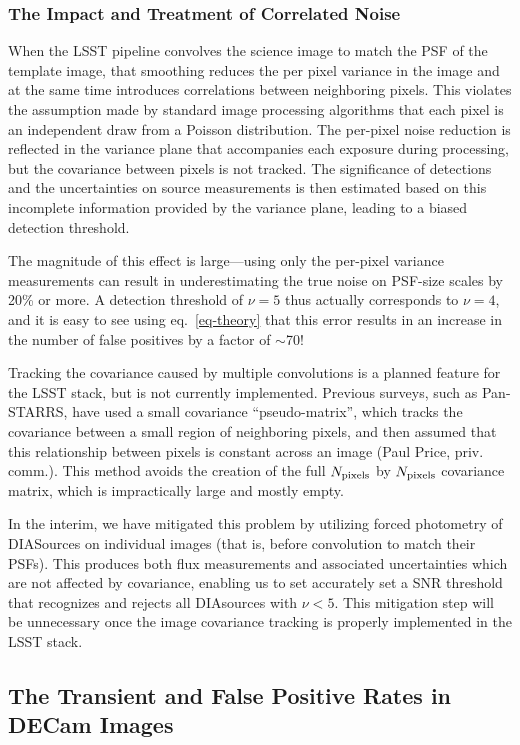 \subsubsection{The Impact and Treatment of Correlated Noise} 

When the LSST pipeline convolves the science image to match the PSF of the template 
image, that smoothing reduces the per pixel variance in the image and at the same
time introduces correlations between neighboring pixels. This violates the
assumption made by standard image processing algorithms that each pixel is an
independent draw from a Poisson distribution. The per-pixel noise reduction is
reflected in the variance plane that accompanies each exposure during
processing, but the covariance between pixels is not tracked. 
The significance of detections and the uncertainties on source measurements is
then estimated based on this incomplete information provided by the variance
plane, leading to a biased detection threshold. 

The magnitude of this effect is large---using only the per-pixel variance
measurements can result in underestimating the true noise on PSF-size scales by
20\% or more. A detection threshold of $\nu=5$ thus actually corresponds to
$\nu=4$, and it is easy to see using eq.~\ref{eq-theory} that this error results
in an increase in the number of false positives by a factor of $\sim$70!

Tracking the covariance caused by multiple convolutions is a planned feature for
the LSST stack, but is not currently implemented. Previous surveys, such as
Pan-STARRS, have used a small covariance ``pseudo-matrix'', which tracks the
covariance between a small region of neighboring pixels, and then assumed that 
this relationship between pixels is constant across an image (Paul Price, priv. comm.).
This method avoids the creation of the full $N_{\rm pixels}$ by $N_{\rm pixels}$
covariance matrix, which is impractically large and mostly empty.

In the interim, we have mitigated this problem by utilizing forced photometry of DIASources
on individual images (that is, before convolution to match their PSFs). This
produces both flux measurements and associated uncertainties which are not
affected by covariance, enabling us to set accurately set a SNR threshold
that recognizes and rejects all DIAsources with $\nu < 5$. This mitigation step
will be unnecessary once the image covariance tracking is properly implemented
in the LSST stack. 


\subsection{The Transient and False Positive Rates in DECam Images} 

